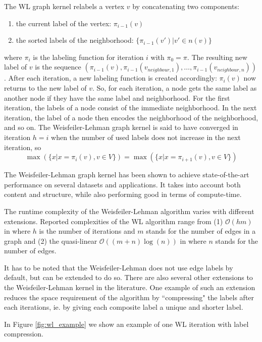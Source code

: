The WL graph kernel relabels a vertex $v$ by concatenating two components:
\begin{enumerate}
    \item{the current label of the vertex: $\pi_{i-1}(v)$}
    \item{the sorted labels of the neighborhood: $\{ \pi_{i-1}(v') | v' \in n(v) \}$}
\end{enumerate}
where $\pi_{i}$ is the labeling function for iteration $i$ with $\pi_0 = \pi$.
The resulting new label of $v$ is the sequence $(\pi_{i-1}(v), \pi_{i-1}(v_{neighbour,1}), \dots , \pi_{i-1}(v_{neighbour,n}))$.
After each iteration, a new labeling function is created accordingly: $\pi_i(v)$ now returns to the new label of $v$.
So, for each iteration, a node gets the same label as another node if they have the same label and neighborhood.
For the first iteration, the labels of a node consist of the immediate neighborhood.
In the next iteration, the label of a node then encodes the neighborhood of the neighborhood, and so on.
The Weisfeiler-Lehman graph kernel is said to have converged in iteration $h = i$ when the number of used labels does not increase in the next iteration, so
\begin{equation*}
\max(\{x | x = \pi_{i}(v), v \in V\}) = \max(\{x | x = \pi_{i  + 1}(v), v \in V\})
\end{equation*}

The Weisfeiler-Lehman graph kernel has been shown to achieve state-of-the-art performance on several datasets and applications.
It takes into account both content and structure, while also performing good in terms of compute-time.

The runtime complexity of the Weisfeiler-Lehman algorithm varies with different extensions.
Reported complexities of the WL algorithm range from (1) $\mathcal{O}(hm)$ in \cite{Shervashidze2009} where $h$ is the number of iterations and $m$ stands for the number of edges in a graph and (2) the quasi-linear $\mathcal{O}((m + n) \log(n))$ in \cite{Kersting2013} where $n$ stands for the number of edges.

It has to be noted that the Weisfeiler-Lehman does not use edge labels by default, but can be extended to do so.
There are also several other extensions to the Weisfeiler-Lehman kernel in the literature.
One example of such an extension reduces the space requirement of the algorithm by ``compressing" the labels after each iterations, ie. by giving each composite label a unique and shorter label.

In Figure \ref{fig:wl_example} we show an example of one WL iteration with label compression.


